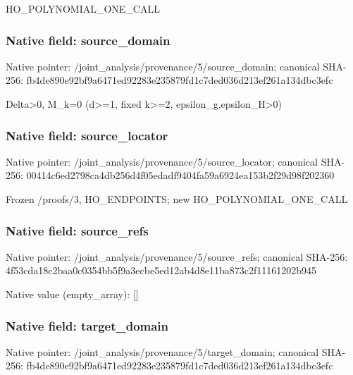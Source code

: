 \documentclass[10pt,a4paper]{article}
\begin{document}
\begingroup\raggedright\sloppy HO\_\allowbreak{}POLYNOMIAL\_\allowbreak{}ONE\_\allowbreak{}CALL\par\endgroup

\subsubsection{Native field: source\_\allowbreak{}domain}
Native pointer: /joint\_\allowbreak{}analysis/provenance/5/source\_\allowbreak{}domain; canonical SHA-256: fb4de890e92bf9a6471ed92283e235879fd1c7ded036d213ef261a134dbc3efc

\begingroup\raggedright\sloppy Delta>0,\allowbreak{} M\_\allowbreak{}k=\allowbreak{}0 (d>=\allowbreak{}1,\allowbreak{} fixed k>=\allowbreak{}2,\allowbreak{} epsilon\_\allowbreak{}g,\allowbreak{}epsilon\_\allowbreak{}H>0)\par\endgroup

\subsubsection{Native field: source\_\allowbreak{}locator}
Native pointer: /joint\_\allowbreak{}analysis/provenance/5/source\_\allowbreak{}locator; canonical SHA-256: 00414c6ed2798ca4db256d4f05edadf9404fa59a6924ea153b2f29d98f202360

\begingroup\raggedright\sloppy Frozen /\allowbreak{}proofs/\allowbreak{}3,\allowbreak{} HO\_\allowbreak{}ENDPOINTS;\allowbreak{} new HO\_\allowbreak{}POLYNOMIAL\_\allowbreak{}ONE\_\allowbreak{}CALL\par\endgroup

\subsubsection{Native field: source\_\allowbreak{}refs}
Native pointer: /joint\_\allowbreak{}analysis/provenance/5/source\_\allowbreak{}refs; canonical SHA-256: 4f53cda18c2baa0c0354bb5f9a3ecbe5ed12ab4d8e11ba873c2f11161202b945

Native value (empty\_\allowbreak{}array): []

\subsubsection{Native field: target\_\allowbreak{}domain}
Native pointer: /joint\_\allowbreak{}analysis/provenance/5/target\_\allowbreak{}domain; canonical SHA-256: fb4de890e92bf9a6471ed92283e235879fd1c7ded036d213ef261a134dbc3efc
\end{document}
